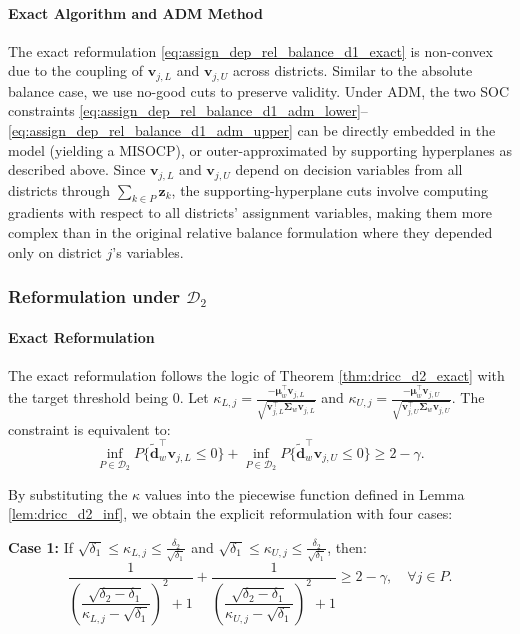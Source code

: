 \documentclass[preprint,12pt,authoryear]{elsarticle}
\begin{document}
\paragraph{Exact Algorithm and ADM Method}
The exact reformulation \eqref{eq:assign_dep_rel_balance_d1_exact} is non-convex due to the coupling of $\mathbf{v}_{j,L}$ and $\mathbf{v}_{j,U}$ across districts. Similar to the absolute balance case, we use no-good cuts to preserve validity. Under ADM, the two SOC constraints \eqref{eq:assign_dep_rel_balance_d1_adm_lower}--\eqref{eq:assign_dep_rel_balance_d1_adm_upper} can be directly embedded in the model (yielding a MISOCP), or outer-approximated by supporting hyperplanes as described above. Since $\mathbf{v}_{j,L}$ and $\mathbf{v}_{j,U}$ depend on decision variables from all districts through $\sum_{k \in P} \mathbf{z}_k$, the supporting-hyperplane cuts involve computing gradients with respect to all districts' assignment variables, making them more complex than in the original relative balance formulation where they depended only on district $j$'s variables.

\subsubsection{Reformulation under $\mathcal{D}_2$}

\paragraph{Exact Reformulation}
The exact reformulation follows the logic of Theorem \ref{thm:dricc_d2_exact} with the target threshold being 0. Let $\kappa_{L,j} = \frac{-\boldsymbol{\mu}_w^\top \mathbf{v}_{j,L}}{\sqrt{\mathbf{v}_{j,L}^\top \boldsymbol{\Sigma}_w \mathbf{v}_{j,L}}}$ and $\kappa_{U,j} = \frac{-\boldsymbol{\mu}_w^\top \mathbf{v}_{j,U}}{\sqrt{\mathbf{v}_{j,U}^\top \boldsymbol{\Sigma}_w \mathbf{v}_{j,U}}}$. The constraint is equivalent to:
\begin{equation}
\inf_{P \in \mathcal{D}_2} P \{ \widetilde{\mathbf{d}}_w^\top \mathbf{v}_{j,L} \leqslant 0 \} + \inf_{P \in \mathcal{D}_2} P \{ \widetilde{\mathbf{d}}_w^\top \mathbf{v}_{j,U} \leqslant 0 \} \geqslant 2 - \gamma.
\end{equation}

By substituting the $\kappa$ values into the piecewise function defined in Lemma \ref{lem:dricc_d2_inf}, we obtain the explicit reformulation with four cases:

\textbf{Case 1:} If $\sqrt{\delta_1} \leqslant \kappa_{L,j} \leqslant \frac{\delta_2}{\sqrt{\delta_1}}$ and $\sqrt{\delta_1} \leqslant \kappa_{U,j} \leqslant \frac{\delta_2}{\sqrt{\delta_1}}$, then:
\begin{equation}
\dfrac{1}{\left( \dfrac{\sqrt{\delta_2 - \delta_1}}{\kappa_{L,j} - \sqrt{\delta_1}} \right)^{2} + 1} + \dfrac{1}{\left( \dfrac{\sqrt{\delta_2 - \delta_1}}{\kappa_{U,j} - \sqrt{\delta_1}} \right)^{2} + 1} \geqslant 2 - \gamma, \quad \forall j \in P.
\label{eq:assign_dep_rel_balance_d2_exact_case1}
\end{equation}
\end{document}

